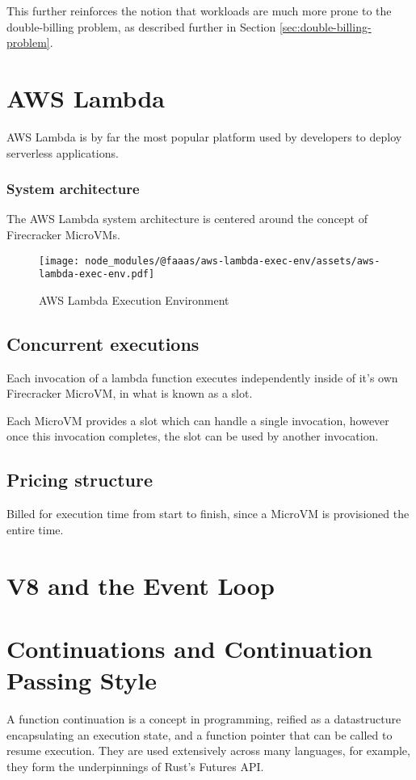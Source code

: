This further reinforces the notion that \faas{} workloads are much more prone to the double-billing problem, as described further in Section \ref{sec:double-billing-problem}.

\section{AWS Lambda}
AWS Lambda is by far the most popular\cite{eismannReviewServerlessUse2020,StateServerlessDatadog} \faas{} platform used by developers to deploy serverless applications.

\subsubsection{System architecture}

The AWS Lambda system architecture is centered around the concept of Firecracker MicroVMs\cite{agacheFirecrackerLightweightVirtualization2020}.

\begin{figure*}[t]
    \texttt{[image: node\_modules/@faaas/aws-lambda-exec-env/assets/aws-lambda-exec-env.pdf]}
    \caption{AWS Lambda Execution Environment}
    \label{fig:aws-lambda-exec-env}
\end{figure*}

\subsection{Concurrent executions}

Each invocation of a lambda function executes independently inside of it's own Firecracker MicroVM, in what is known as a slot.

Each MicroVM provides a slot which can handle a single invocation, however once this invocation completes, the slot can be used by another invocation.

\subsection{Pricing structure}

Billed for execution time from start to finish, since a MicroVM is provisioned the entire time.

\section{V8 and the Event Loop}
\label{sec:js-event-loop}


\section{Continuations and Continuation Passing Style}
A function continuation is a concept in programming\cite{sussmanSCHEMEInterpreterExtended1975}, reified as a datastructure encapsulating an execution state, and a function pointer that can be called to resume execution. They are used extensively across many languages, for example, they form the underpinnings of Rust's Futures API.
